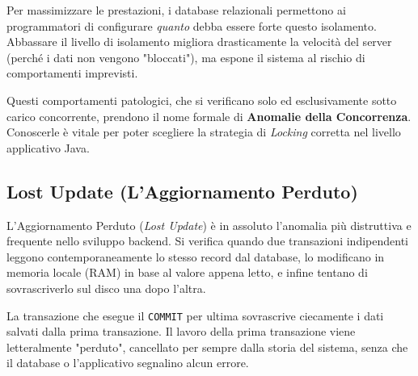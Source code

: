 Per massimizzare le prestazioni, i database relazionali permettono ai programmatori di configurare \textit{quanto} debba essere forte questo isolamento. Abbassare il livello di isolamento migliora drasticamente la velocità del server (perché i dati non vengono "bloccati"), ma espone il sistema al rischio di comportamenti imprevisti. 

Questi comportamenti patologici, che si verificano solo ed esclusivamente sotto carico concorrente, prendono il nome formale di \textbf{Anomalie della Concorrenza}. Conoscerle è vitale per poter scegliere la strategia di \textit{Locking} corretta nel livello applicativo Java.

\subsection{Lost Update (L'Aggiornamento Perduto)}

L'Aggiornamento Perduto (\textit{Lost Update}) è in assoluto l'anomalia più distruttiva e frequente nello sviluppo backend. Si verifica quando due transazioni indipendenti leggono contemporaneamente lo stesso record dal database, lo modificano in memoria locale (RAM) in base al valore appena letto, e infine tentano di sovrascriverlo sul disco una dopo l'altra.

La transazione che esegue il \texttt{COMMIT} per ultima sovrascrive ciecamente i dati salvati dalla prima transazione. Il lavoro della prima transazione viene letteralmente "perduto", cancellato per sempre dalla storia del sistema, senza che il database o l'applicativo segnalino alcun errore.


